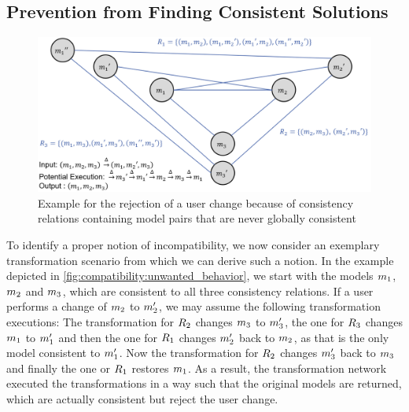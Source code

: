 \subsection{Prevention from Finding Consistent Solutions}
\label{chap:compatibility:informal:prevention}

\begin{figure}
    \centering
    \includegraphics[width=\textwidth]{figures/correctness/compatibility/unwanted_behavior.png}
    \caption[Example for the unwanted rejection of a user change]{Example for the rejection of a user change because of consistency relations containing model pairs that are never globally consistent}
    \label{fig:compatibility:unwanted_behavior}
\end{figure}

To identify a proper notion of incompatibility, we now consider an exemplary transformation scenario from which we can derive such a notion.
In the example depicted in \autoref{fig:compatibility:unwanted_behavior}, we start with the models $m_{1}$, $m_{2}$ and $m_{3}$, which are consistent to all three consistency relations.
If a user performs a change of $m_{2}$ to $m_{2}'$, we may assume the following transformation executions:
The transformation for $R_{2}$ changes $m_{3}$ to $m_{3}'$, the one for $R_{3}$ changes $m_{1}$ to $m_{1}'$ and then the one for $R_{1}$ changes $m_{2}'$ back to $m_{2}$, as that is the only model consistent to $m_{1}'$.
Now the transformation for $R_{2}$ changes $m_{3}'$ back to $m_{3}$ and finally the one or $R_{1}$ restores $m_{1}$.
As a result, the transformation network executed the transformations in a way such that the original models are returned, which are actually consistent but reject the user change.

